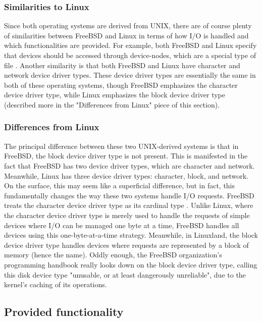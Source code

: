 \documentclass[letterpaper,10pt,titlepage]{article}
\begin{document}
\subsubsection{Similarities to Linux}
Since both operating systems are derived from UNIX, there are of course plenty of similarities between FreeBSD and Linux in terms of how I/O is handled and which functionalities are provided. For example, both FreeBSD and Linux specify that devices should be accessed through device-nodes, which are a special type of file \cite{freeBSD1} \cite{linux}. Another similarity is that both FreeBSD and Linux have character and network device driver types. These device driver types are essentially the same in both of these operating systems, though FreeBSD emphasizes the character device driver type, while Linux emphasizes the block device driver type (described more in the "Differences from Linux" piece of this section).  
\subsubsection{Differences from Linux}
The principal difference between these two UNIX-derived systems is that in FreeBSD, the block device driver type is not present. This is manifested in the fact that FreeBSD has two device driver types, which are character and network. Meanwhile, Linux has three device driver types: character, block, and network. On the surface, this may seem like a superficial difference, but in fact, this fundamentally changes the way these two systems handle I/O requests. FreeBSD treats the character device driver type as its cardinal type \cite{freeBSD2}. Unlike Linux, where the character device driver type is merely used to handle the requests of simple devices where I/O can be managed one byte at a time, FreeBSD handles all devices using this one-byte-at-a-time strategy. Meanwhile, in Linuxland, the block device driver type handles devices where requests are represented by a block of memory (hence the name). Oddly enough, the FreeBSD organization's programming handbook really looks down on the block device driver type, calling this disk device type "unusable, or at least dangerously unreliable", due to the kernel's caching of its operations.  
\subsection{Provided functionality}
\end{document}
